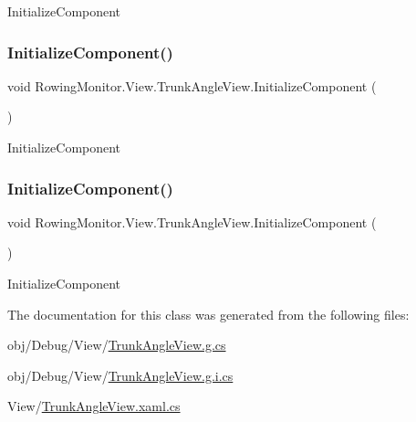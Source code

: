 Initialize\+Component 

\mbox{\label{class_rowing_monitor_1_1_view_1_1_trunk_angle_view_a0bb4fedfe9f2b058a0ee1ae5841242ce}} 
\subsubsection{\texorpdfstring{Initialize\+Component()}{InitializeComponent()}\hspace{0.1cm}{\footnotesize\ttfamily [3/4]}}
{\footnotesize\ttfamily void Rowing\+Monitor.\+View.\+Trunk\+Angle\+View.\+Initialize\+Component (\begin{DoxyParamCaption}{ }\end{DoxyParamCaption})}



Initialize\+Component 

\mbox{\label{class_rowing_monitor_1_1_view_1_1_trunk_angle_view_a0bb4fedfe9f2b058a0ee1ae5841242ce}} 
\subsubsection{\texorpdfstring{Initialize\+Component()}{InitializeComponent()}\hspace{0.1cm}{\footnotesize\ttfamily [4/4]}}
{\footnotesize\ttfamily void Rowing\+Monitor.\+View.\+Trunk\+Angle\+View.\+Initialize\+Component (\begin{DoxyParamCaption}{ }\end{DoxyParamCaption})}



Initialize\+Component 



The documentation for this class was generated from the following files\+:\begin{DoxyCompactItemize}
\item 
obj/\+Debug/\+View/\hyperlink{_debug_2_view_2_trunk_angle_view_8g_8cs}{Trunk\+Angle\+View.\+g.\+cs}\item 
obj/\+Debug/\+View/\hyperlink{_debug_2_view_2_trunk_angle_view_8g_8i_8cs}{Trunk\+Angle\+View.\+g.\+i.\+cs}\item 
View/\hyperlink{_trunk_angle_view_8xaml_8cs}{Trunk\+Angle\+View.\+xaml.\+cs}\end{DoxyCompactItemize}
